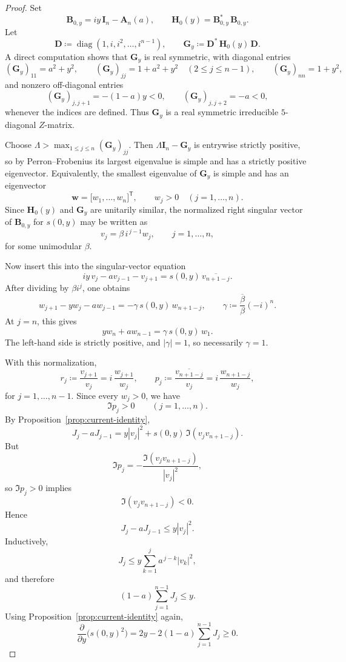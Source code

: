 \documentclass[11pt]{article}
\begin{document}
\begin{proof}
Set
\[
\mathbf B_{0,y}=iy\,\mathbf I_n-\mathbf A_n(a),
\qquad
\mathbf H_0(y)=\mathbf B_{0,y}^*\,\mathbf B_{0,y}.
\]
Let
\[
\mathbf D\coloneqq \operatorname{diag}(1,i,i^2,\dots,i^{n-1}),
\qquad
\mathbf G_y\coloneqq \mathbf D^*\,\mathbf H_0(y)\,\mathbf D.
\]
A direct computation shows that \(\mathbf G_y\) is real symmetric, with diagonal entries
\[
(\mathbf G_y)_{11}=a^2+y^2,
\qquad
(\mathbf G_y)_{jj}=1+a^2+y^2\quad (2\le j\le n-1),
\qquad
(\mathbf G_y)_{nn}=1+y^2,
\]
and nonzero off-diagonal entries
\[
(\mathbf G_y)_{j,j+1}=-(1-a)y<0,
\qquad
(\mathbf G_y)_{j,j+2}=-a<0,
\]
whenever the indices are defined. Thus \(\mathbf G_y\) is a real symmetric irreducible \(5\)-diagonal \(Z\)-matrix.

Choose \(\Lambda>\max_{1\le j\le n}(\mathbf G_y)_{jj}\). Then \(\Lambda\mathbf I_n-\mathbf G_y\) is entrywise strictly positive, so by Perron--Frobenius its largest eigenvalue is simple and has a strictly positive eigenvector. Equivalently, the smallest eigenvalue of \(\mathbf G_y\) is simple and has an eigenvector
\[
\mathbf w=\bigl[w_1,\dots,w_n\bigr]^{\mathsf T},
\qquad
w_j>0\quad (j=1,\dots,n).
\]
Since \(\mathbf H_0(y)\) and \(\mathbf G_y\) are unitarily similar, the normalized right singular vector of \(\mathbf B_{0,y}\) for \(s(0,y)\) may be written as
\[
v_j=\beta\,i^{\,j-1}w_j,
\qquad
j=1,\dots,n,
\]
for some unimodular \(\beta\).

Now insert this into the singular-vector equation
\[
iy\,v_j-a v_{j-1}-v_{j+1}=s(0,y)\,\overline{v_{n+1-j}}.
\]
After dividing by \(\beta i^j\), one obtains
\[
w_{j+1}-y w_j-a w_{j-1}=-\gamma\,s(0,y)\,w_{n+1-j},
\qquad
\gamma\coloneqq \frac{\overline\beta}{\beta}(-i)^n.
\]
At \(j=n\), this gives
\[
y w_n+a w_{n-1}=\gamma\,s(0,y)\,w_1.
\]
The left-hand side is strictly positive, and \(|\gamma|=1\), so necessarily \(\gamma=1\).

With this normalization,
\[
r_j\coloneqq \frac{v_{j+1}}{v_j}=i\,\frac{w_{j+1}}{w_j},
\qquad
p_j\coloneqq \frac{\overline{v_{n+1-j}}}{v_j}=i\,\frac{w_{n+1-j}}{w_j},
\]
for \(j=1,\dots,n-1\). Since every \(w_j>0\), we have
\[
\Im p_j>0
\qquad
(j=1,\dots,n).
\]
By Proposition~\ref{prop:current-identity},
\[
J_j-aJ_{j-1}=y|v_j|^2+s(0,y)\,\Im(v_jv_{n+1-j}).
\]
But
\[
\Im p_j
=
-\frac{\Im(v_jv_{n+1-j})}{|v_j|^2},
\]
so \(\Im p_j>0\) implies
\[
\Im(v_jv_{n+1-j})<0.
\]
Hence
\[
J_j-aJ_{j-1}\le y|v_j|^2.
\]
Inductively,
\[
J_j\le y\sum_{k=1}^j a^{\,j-k}|v_k|^2,
\]
and therefore
\[
(1-a)\sum_{j=1}^{n-1}J_j\le y.
\]
Using Proposition~\ref{prop:current-identity} again,
\[
\frac{\partial}{\partial y}\bigl(s(0,y)^2\bigr)
=
2y-2(1-a)\sum_{j=1}^{n-1}J_j
\ge 0.
\]
\end{proof}
\end{document}
